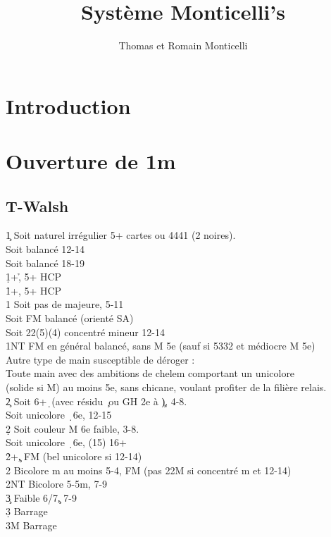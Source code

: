 \documentclass[a4paper]{article}
\title{Système Monticelli's}
\author{Thomas et Romain Monticelli}
\begin{document}
\maketitle
\tableofcontents

\section{Introduction}

\section{Ouverture de 1m}

\subsection{T-Walsh}

\begin{bidtable}
1\c \> Soit naturel irrégulier 5+ cartes ou 4441 (2 noires).\+\\
Soit \> balancé 12-14\\
Soit \> balancé 18-19\\
1\d {}+\h , 5+ HCP\\
1\h {}+\s , 5+ HCP\\
1\s \> Soit pas de majeure, 5-11\\
\>Soit FM balancé (orienté SA)\\
\>Soit 22(5)(4) concentré mineur 12-14\\
1NT \> FM en général balancé, sans M 5e (sauf si 5332 et médiocre M 5e)\\
\>Autre type de main susceptible de déroger : \\
\>Toute main avec des ambitions de chelem comportant un unicolore \\
\>(solide si M) au moins 5e, sans chicane, voulant profiter de la filière relais.\\
2\c \> Soit 6+\d\ (avec résidu \c\ ou GH 2e à \c ), 4-8.\\
\>Soit unicolore \d\ 6e, 12-15\\
2\d \> Soit couleur M 6e faible, 3-8.\\
\>Soit unicolore \d\ 6e, (15) 16+\\
2\h {}+\c , FM (bel unicolore si 12-14)\\
2\s \> Bicolore m au moins 5-4, FM (pas 22M si concentré m et 12-14)\\
2NT \> Bicolore 5-5m, 7-9\\
3\c \> Faible 6/7\c , 7-9\\
3\d \> Barrage\\
3M \> Barrage\-
\end{bidtable}
\end{document}
